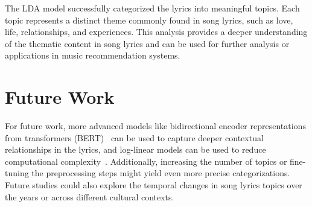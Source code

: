 \documentclass{article}
\begin{document}
\noindent The LDA model successfully categorized the lyrics into meaningful topics. Each topic represents a distinct theme commonly found in song lyrics, such as love, life, relationships, and experiences. This analysis provides a deeper understanding of the thematic content in song lyrics and can be used for further analysis or applications in music recommendation systems.

\section{Future Work}

For future work, more advanced models like bidirectional encoder representations from transformers (BERT)~\cite{devlin2018bert} can be used to capture deeper contextual relationships in the lyrics, and log-linear models can be used to reduce computational complexity~\cite{mikolov2013efficient}. Additionally, increasing the number of topics or fine-tuning the preprocessing steps might yield even more precise categorizations. Future studies could also explore the temporal changes in song lyrics topics over the years or across different cultural contexts.

\printbibliography

\newpage
\end{document}
